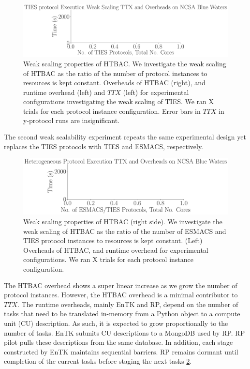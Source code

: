 \begin{figure}
  \centering
    \includegraphics[width=\columnwidth]{figures/ties_ws_pseudo.pdf}
    \caption{Weak scaling properties of HTBAC. We investigate the weak
    scaling of HTBAC as the ratio of the number of protocol instances to
    resources is kept constant. Overheads of HTBAC (right), and runtime
    overhead (left) and \(TTX\) (left) for experimental configurations
    investigating the weak scaling of TIES. We ran X trials for each protocol
    instance configuration. Error bars in \(TTX\) in y-protocol runs are
    insignificant.}
\label{fig:weak_scaling_TIES}
\end{figure}

The second weak scalability experiment repeats the same experimental design
yet replaces the TIES protocols with TIES and ESMACS, respectively.

\begin{figure}
  \centering
    \includegraphics[width=\columnwidth]{figures/esmacs_ties_ws_pseudo.pdf}
    \caption{Weak scaling properties of HTBAC (right side). We investigate
    the weak scaling of HTBAC as the ratio of the number of ESMACS and TIES
    protocol instances to resources is kept constant. (Left) Overheads of
    HTBAC, and runtime overhead for experimental configurations. We ran X
    trials for each protocol instance configuration.}
\label{fig:weak_scaling_ESMACS_TIES}
\end{figure}

The HTBAC overhead shows a super linear increase as we grow the number of
protocol instances. However, the HTBAC overhead is a minimal contributor to
\(TTX\). The runtime overheads, mainly EnTK and RP, depend on the number of
tasks that need to be translated in-memory from a Python object to a compute
unit (CU) description. As such, it is expected to grow proportionally to the
number of tasks. EnTK submits CU descriptions to a MongoDB used by RP. RP
pilot pulls these descriptions from the same database.
In addition, each stage constructed by EnTK maintains sequential barriers. RP
remains dormant until completion of the current tasks before staging the next
tasks \ref{fig:weak_scaling_ESMACS_TIES}.

